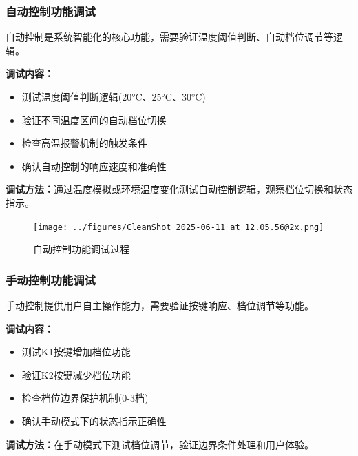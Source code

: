 \subsubsection{自动控制功能调试}

\qquad 自动控制是系统智能化的核心功能，需要验证温度阈值判断、自动档位调节等逻辑。

\textbf{调试内容：}
\begin{itemize}
    \vspace{-6pt}
  \item 测试温度阈值判断逻辑(20°C、25°C、30°C)
    \vspace{-6pt}
  \item 验证不同温度区间的自动档位切换
    \vspace{-6pt}
  \item 检查高温报警机制的触发条件
    \vspace{-6pt}
  \item 确认自动控制的响应速度和准确性
\end{itemize}

\textbf{调试方法：}通过温度模拟或环境温度变化测试自动控制逻辑，观察档位切换和状态指示。

\begin{figure}[H]
  \centering
  \texttt{[image: ../figures/CleanShot 2025-06-11 at 12.05.56@2x.png]}
  \caption{自动控制功能调试过程}
  \label{fig:auto_control_debug}
\end{figure}

\subsubsection{手动控制功能调试}

\qquad 手动控制提供用户自主操作能力，需要验证按键响应、档位调节等功能。

\textbf{调试内容：}
\begin{itemize}
    \vspace{-6pt}
  \item 测试K1按键增加档位功能
    \vspace{-6pt}
  \item 验证K2按键减少档位功能
    \vspace{-6pt}
  \item 检查档位边界保护机制(0-3档)
    \vspace{-6pt}
  \item 确认手动模式下的状态指示正确性
\end{itemize}

\textbf{调试方法：}在手动模式下测试档位调节，验证边界条件处理和用户体验。

